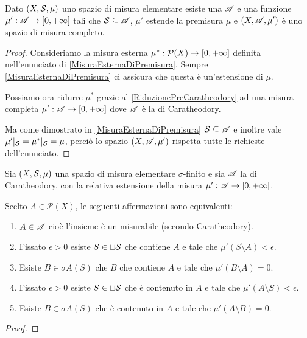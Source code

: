 \begin{theorem}\label{EstensionexCaratheodory}
	Dato $(X,\S,\mu)$ uno spazio di misura elementare esiste una \sigalg{} $\A$ e una funzione $\mu':\A\to\Rpiu$ tali che $\S\subseteq \A$, $\mu'$ estende la premisura $\mu$ e $(X,\A,\mu')$ è uno spazio di misura completo.
\end{theorem}
\begin{proof}
	Consideriamo la misura esterna $\mu^*:\mathcal P(X)\to\Rpiu$ definita nell'enunciato di \cref{MisuraEsternaDiPremisura}. Sempre \cref{MisuraEsternaDiPremisura} ci assicura che questa è un'estensione di $\mu$.
	
	Possiamo ora ridurre $\mu^*$ grazie al \cref{RiduzionePreCaratheodory} ad una misura completa $\mu':\A\to\Rpiu$ dove $\A$ è la \sigalg{} di Caratheodory. 
	
	Ma come dimostrato in \cref{MisuraEsternaDiPremisura} $\S\subseteq\A$ e inoltre vale $\mu'|_\S=\mu^*|_\S=\mu$, perciò lo spazio $(X,\A,\mu')$ rispetta tutte le richieste dell'enunciato.
\end{proof}

\begin{proposition}
	Sia $(X,\S,\mu)$ una spazio di misura elementare $\sigma$-finito e sia $\A$ la \sigalg{} di Caratheodory, con la relativa estensione della misura $\mu':\A\to\Rpiu$.
	
	Scelto $A\in\mathcal P(X)$, le seguenti affermazioni sono equivalenti:
	\begin{enumerate}
		\item $A\in\A$ cioè l'insieme è un misurabile (secondo Caratheodory).
		\item Fissato $\epsilon>0$ esiste $S\in\sqcup\S$ che contiene $A$ e tale che $\mu'(S\setminus A)<\epsilon$.
		\item Esiste $B\in\sigma A(S)$ che $B$ che contiene $A$ e tale che $\mu'(B\setminus A)=0$.
		\item Fissato $\epsilon>0$ esiste $S\in\sqcup\S$ che è contenuto in $A$ e tale che $\mu'(A\setminus S)<\epsilon$.
		\item Esiste $B\in\sigma A(S)$ che è contenuto in $A$ e tale che $\mu'(A\setminus B)=0$.
	\end{enumerate}
\end{proposition}
\begin{proof}
	
\end{proof}
